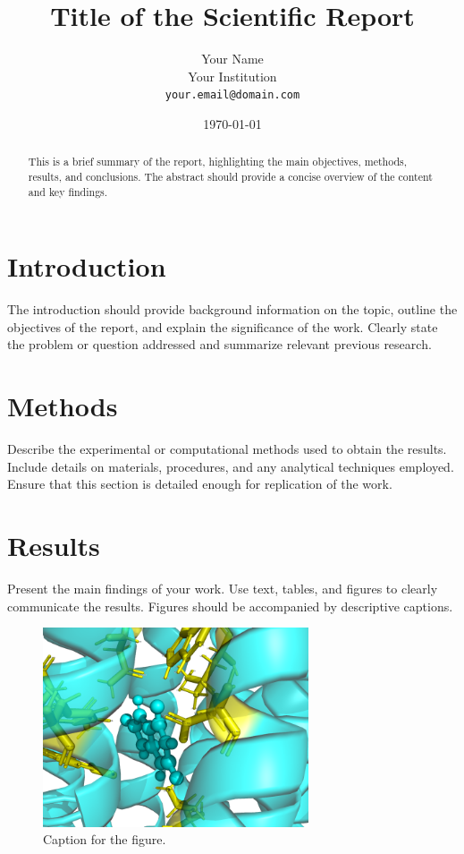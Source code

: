 \documentclass[12pt]{article}
\title{Title of the Scientific Report}
\author{Your Name \\
        Your Institution \\
        \texttt{your.email@domain.com}}
\date{\today}
\begin{document}
\maketitle

\begin{abstract}
    This is a brief summary of the report, highlighting the main objectives, methods, results, and conclusions. The abstract should provide a concise overview of the content and key findings.
\end{abstract}

\section{Introduction}
    The introduction should provide background information on the topic, outline the objectives of the report, and explain the significance of the work. Clearly state the problem or question addressed and summarize relevant previous research.

\section{Methods}
    Describe the experimental or computational methods used to obtain the results. Include details on materials, procedures, and any analytical techniques employed. Ensure that this section is detailed enough for replication of the work.

\section{Results}
    Present the main findings of your work. Use text, tables, and figures to clearly communicate the results. Figures should be accompanied by descriptive captions.

    \begin{figure}[h!]
        \centering
        \includegraphics[width=0.7\textwidth]{./figures/membrane_protein.png}
        \caption{Caption for the figure.}
        \label{fig:example}
    \end{figure}
\end{document}
